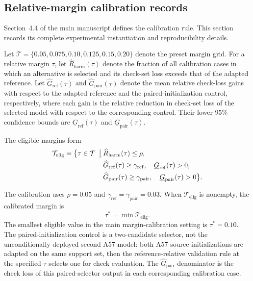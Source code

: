 \documentclass[11pt,a4paper]{article}
\begin{document}
\subsection{Relative-margin calibration records}

Section~4.4 of the main manuscript defines the calibration rule. This section
records its complete experimental instantiation and reproducibility details.

Let
$\mathcal{T}=\{0.05,0.075,0.10,0.125,0.15,0.20\}$
denote the preset margin grid. For a relative margin $\tau$, let
$\widehat R_{\mathrm{harm}}(\tau)$ denote the fraction of all calibration
cases in which an alternative is selected and its check-set loss exceeds that
of the adapted reference. Let $\widehat G_{\mathrm{ref}}(\tau)$ and
$\widehat G_{\mathrm{pair}}(\tau)$ denote the mean relative check-loss gains
with respect to the adapted reference and the paired-initialization control,
respectively, where each gain is the relative reduction in check-set loss of
the selected model with respect to the corresponding control. Their lower
95\% confidence bounds are
$\underline G_{\mathrm{ref}}(\tau)$ and
$\underline G_{\mathrm{pair}}(\tau)$.

The eligible margins form
\begin{equation}
\begin{aligned}
\mathcal{T}_{\mathrm{elig}}
=
\bigl\{
\tau\in\mathcal{T}
\;\bigm|\;&
\widehat R_{\mathrm{harm}}(\tau)\leq\rho,
\\
&
\widehat G_{\mathrm{ref}}(\tau)\geq\gamma_{\mathrm{ref}},
\quad
\underline G_{\mathrm{ref}}(\tau)>0,
\\
&
\widehat G_{\mathrm{pair}}(\tau)\geq\gamma_{\mathrm{pair}},
\quad
\underline G_{\mathrm{pair}}(\tau)>0
\bigr\}.
\end{aligned}
\label{eq:supp-margin-calibration}
\end{equation}

The calibration uses
$\rho=0.05$ and
$\gamma_{\mathrm{ref}}=\gamma_{\mathrm{pair}}=0.03$.
When $\mathcal{T}_{\mathrm{elig}}$ is nonempty, the calibrated margin is
\begin{equation}
\tau^{*}=\min \mathcal{T}_{\mathrm{elig}}.
\end{equation}
The smallest eligible value in the main margin-calibration setting is
$\tau^{*}=0.10$.
The paired-initialization control is a two-candidate selector, not the
unconditionally deployed second A57 model: both A57 source initializations
are adapted on the same support set, then the reference-relative validation
rule at the specified $\tau$ selects one for check evaluation.
The $\widehat G_{\mathrm{pair}}$ denominator is the check loss of this
paired-selector output in each corresponding calibration case.
\end{document}
